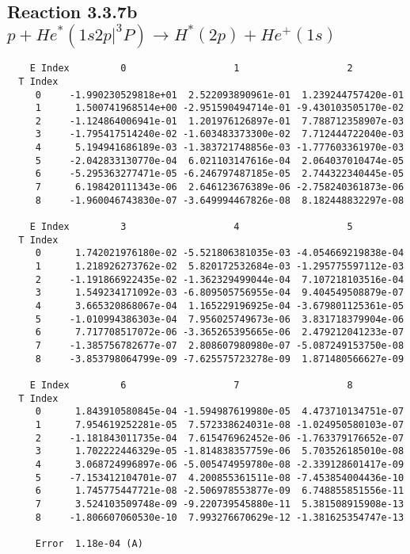 \documentclass[12pt]{article}
\begin{document}
                               


\newpage
\subsection{
Reaction 3.3.7b $  p + He^*(1s2p|^3P) \rightarrow H^*(2p) + He^+(1s)$}


\begin{small}\begin{verbatim}
    E Index         0                   1                   2
  T Index
     0     -1.990230529818e+01  2.522093890961e-01  1.239244757420e-01
     1      1.500741968514e+00 -2.951590494714e-01 -9.430103505170e-02
     2     -1.124864006941e-01  1.201976126897e-01  7.788712358907e-03
     3     -1.795417514240e-02 -1.603483373300e-02  7.712444722040e-03
     4      5.194941686189e-03 -1.383721748856e-03 -1.777603361970e-03
     5     -2.042833130770e-04  6.021103147616e-04  2.064037010474e-05
     6     -5.295363277471e-05 -6.246797487185e-05  2.744322340445e-05
     7      6.198420111343e-06  2.646123676389e-06 -2.758240361873e-06
     8     -1.960046743830e-07 -3.649994467826e-08  8.182448832297e-08

    E Index         3                   4                   5
  T Index
     0      1.742021976180e-02 -5.521806381035e-03 -4.054669219838e-04
     1      1.218926273762e-02  5.820172532684e-03 -1.295775597112e-03
     2     -1.191866922435e-02 -1.362329499044e-04  7.107218103516e-04
     3      1.549234171092e-03 -6.809505756955e-04  9.404549508879e-07
     4      3.665320868067e-04  1.165229196925e-04 -3.679801125361e-05
     5     -1.010994386303e-04  7.956025749673e-06  3.831718379904e-06
     6      7.717708517072e-06 -3.365265395665e-06  2.479212041233e-07
     7     -1.385756782677e-07  2.808607980980e-07 -5.087249153750e-08
     8     -3.853798064799e-09 -7.625575723278e-09  1.871480566627e-09

    E Index         6                   7                   8
  T Index
     0      1.843910580845e-04 -1.594987619980e-05  4.473710134751e-07
     1      7.954619252281e-05  7.572338624031e-08 -1.024950580103e-07
     2     -1.181843011735e-04  7.615476962452e-06 -1.763379176652e-07
     3      1.702222446329e-05 -1.814838357759e-06  5.703526185010e-08
     4      3.068724996897e-06 -5.005474959780e-08 -2.339128601417e-09
     5     -7.153412104701e-07  4.200855361511e-08 -7.453854004436e-10
     6      1.745775447721e-08 -2.506978553877e-09  6.748855851556e-11
     7      3.524103509748e-09 -9.220739545880e-11  5.381508915908e-13
     8     -1.806607060530e-10  7.993276670629e-12 -1.381625354747e-13

     Error  1.18e-04 (A)
\end{verbatim}\end{small}
\end{document}
